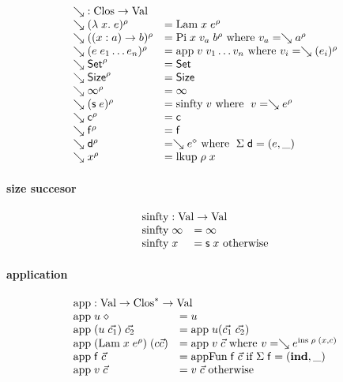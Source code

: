 \[
\begin{array}{ll}
\multicolumn{2}{l}{\wh \; : \Clos \ra \Val}\\
\wh \clp{\lam{x}{e}}{\rho} & = \vlam \; x \; \cl{e}{\rho} \\
\wh \clp{\EPi{x}{a}{b}}{\rho} &= \vpi \; x \; v_a \; \cl{b}{\rho} \mbox{ where } v_a = \wh \cl{a}{\rho} \\
\wh \clp{e \; e_1 \ldots e_n}{\rho} &= \ap \; v \; v_1 \ldots v_n \mbox{ where } v_i = \wh \cl{(e_i)}{\rho} \\
\wh \cl{\Set}{\rho} & = \Set \\ 
\wh \cl{\Size}{\rho} & = \Size \\
\wh \cl{\infty}{\rho} & = \infty  \\
\wh \clp{\s e}{\rho} & = \sinfty \; v \mbox{ where } \; v = \wh \cl{e}{\rho} \\ 
\wh \cl{\cc}{\rho} & = \cc  \\
\wh \cl{\ff}{\rho} & = \ff \\
\wh \cl{\dd}{\rho} & = \wh \cl{e}{\diamond} \mbox{ where } \; \Sig \; \dd = (e,\_)\\
\wh \cl{x}{\rho} & = \lkup \; \rho \; x \\
\end{array}
\]

\paragraph*{size succesor}

\[
\begin{array}[t]{ll}
\multicolumn{2}{l}{\sinfty : \Val \ra \Val}\\ 
\sinfty \; \infty & = \infty\\
\sinfty \;  x & = \s x  \mbox{ otherwise}\\ 
\end{array}
\]
\paragraph*{application}
\[
\begin{array}{ll}
\multicolumn{2}{l}{\ap : \Val \ra \ves{\Clos} \ra \Val}\\
\ap \; u \; \diamond & = u \\
\ap \; (u \; \vec{c_1}) \; \vec{c_2} & = \ap \; u (\vec{c_1}\;\vec{c_2})\\
\ap \; (\vlam \; x \; \cl{e}{\rho}) \; (c \vec{c}) & = \ap \; v \; \vec{c} \mbox{ where } v = \wh \cl{e}{\ins \; \rho \; (x,c)} \\ 
\ap \; \ff \; \vec{c} & = \apf \; \ff \; \vec{c} \mbox{ if } \Sig \; \ff = (\ind,\_) \\
\ap \; v \; \vec{c} & = v \; \vec{c} \mbox{ otherwise } \\
\end{array}
\]


